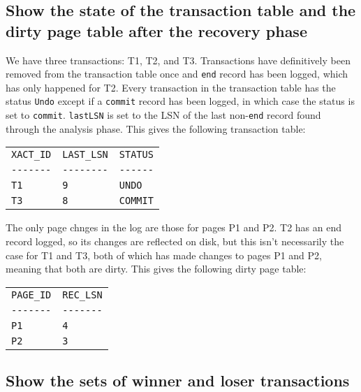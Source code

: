 \documentclass{article}
\begin{document}
\subsection{Show the state of the transaction table and the dirty page table after the recovery phase}

We have three transactions: T1, T2, and T3. Transactions have definitively been removed from the transaction table once and \verb|end| record has been logged, which has only happened for T2. Every transaction in the transaction table has the status \verb|Undo| except if a \verb|commit| record has been logged, in which case the status is set to \verb|commit|. \verb|lastLSN| is set to the LSN of the last non-\verb|end| record found through the analysis phase. This gives the following transaction table:

\begin{table}[h]
    \centering
    \begin{tabular}{lll}
        \verb|XACT_ID| & \verb|LAST_LSN| & \verb|STATUS| \\
        \verb|-------| & \verb|--------| & \verb|------| \\
        \verb|T1| & \verb|9| & \verb|UNDO| \\
        \verb|T3| & \verb|8| & \verb|COMMIT| \\
    \end{tabular}
\end{table}

The only page chnges in the log are those for pages P1 and P2. T2 has an end record logged, so its changes are reflected on disk, but this isn't necessarily the case for T1 and T3, both of which has made changes to pages P1 and P2, meaning that both are dirty. This gives the following dirty page table:

\begin{table}[h]
    \centering
    \begin{tabular}{ll}
        \verb|PAGE_ID| & \verb|REC_LSN| \\
        \verb|-------| & \verb|-------| \\
        \verb|P1| & \verb|4| \\
        \verb|P2| & \verb|3| \\
    \end{tabular}
\end{table}

\subsection{Show the sets of winner and loser transactions}
\end{document}

